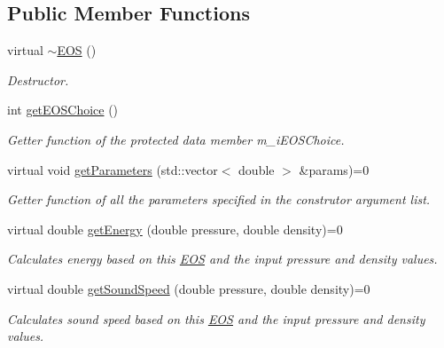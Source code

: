 \subsection*{Public Member Functions}
\begin{DoxyCompactItemize}
\item 
\hypertarget{classEOS_ae6f21ee2d4c48acbac976d8c54f520f6}{virtual \hyperlink{classEOS_ae6f21ee2d4c48acbac976d8c54f520f6}{$\sim$\-E\-O\-S} ()}\label{classEOS_ae6f21ee2d4c48acbac976d8c54f520f6}

\begin{DoxyCompactList}\small\item\em Destructor. \end{DoxyCompactList}\item 
\hypertarget{classEOS_a9eb240115a907fda4e4ded60a2045d2a}{int \hyperlink{classEOS_a9eb240115a907fda4e4ded60a2045d2a}{get\-E\-O\-S\-Choice} ()}\label{classEOS_a9eb240115a907fda4e4ded60a2045d2a}

\begin{DoxyCompactList}\small\item\em Getter function of the protected data member m\-\_\-i\-E\-O\-S\-Choice. \end{DoxyCompactList}\item 
virtual void \hyperlink{classEOS_ae658a4cdb726da6502cc58566abe1c53}{get\-Parameters} (std\-::vector$<$ double $>$ \&params)=0
\begin{DoxyCompactList}\small\item\em Getter function of all the parameters specified in the construtor argument list. \end{DoxyCompactList}\item 
virtual double \hyperlink{classEOS_acaaad3b306b042a03f5669a719588c85}{get\-Energy} (double pressure, double density)=0
\begin{DoxyCompactList}\small\item\em Calculates energy based on this \hyperlink{classEOS}{E\-O\-S} and the input pressure and density values. \end{DoxyCompactList}\item 
virtual double \hyperlink{classEOS_a6afa3c018685f2100b649fd804a4f3dc}{get\-Sound\-Speed} (double pressure, double density)=0
\begin{DoxyCompactList}\small\item\em Calculates sound speed based on this \hyperlink{classEOS}{E\-O\-S} and the input pressure and density values. \end{DoxyCompactList}\end{DoxyCompactItemize}
